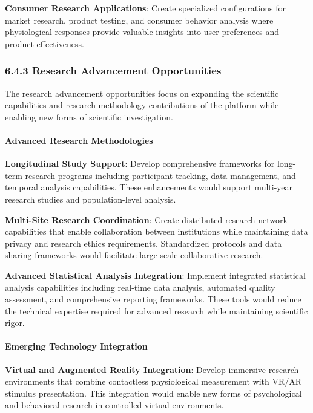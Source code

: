 \documentclass[11pt,a4paper]{article}
\begin{document}
\textbf{Consumer Research Applications}: Create specialized configurations for market research, product testing, and consumer
behavior analysis where physiological responses provide valuable insights into user preferences and product
effectiveness.

\subsubsection{6.4.3 Research Advancement Opportunities}

The research advancement opportunities focus on expanding the scientific capabilities and research methodology
contributions of the platform while enabling new forms of scientific investigation.

\paragraph{Advanced Research Methodologies}

\textbf{Longitudinal Study Support}: Develop comprehensive frameworks for long-term research programs including participant
tracking, data management, and temporal analysis capabilities. These enhancements would support multi-year research
studies and population-level analysis.

\textbf{Multi-Site Research Coordination}: Create distributed research network capabilities that enable collaboration between
institutions while maintaining data privacy and research ethics requirements. Standardized protocols and data sharing
frameworks would facilitate large-scale collaborative research.

\textbf{Advanced Statistical Analysis Integration}: Implement integrated statistical analysis capabilities including
real-time data analysis, automated quality assessment, and comprehensive reporting frameworks. These tools would reduce
the technical expertise required for advanced research while maintaining scientific rigor.

\paragraph{Emerging Technology Integration}

\textbf{Virtual and Augmented Reality Integration}: Develop immersive research environments that combine contactless
physiological measurement with VR/AR stimulus presentation. This integration would enable new forms of psychological and
behavioral research in controlled virtual environments.
\end{document}
